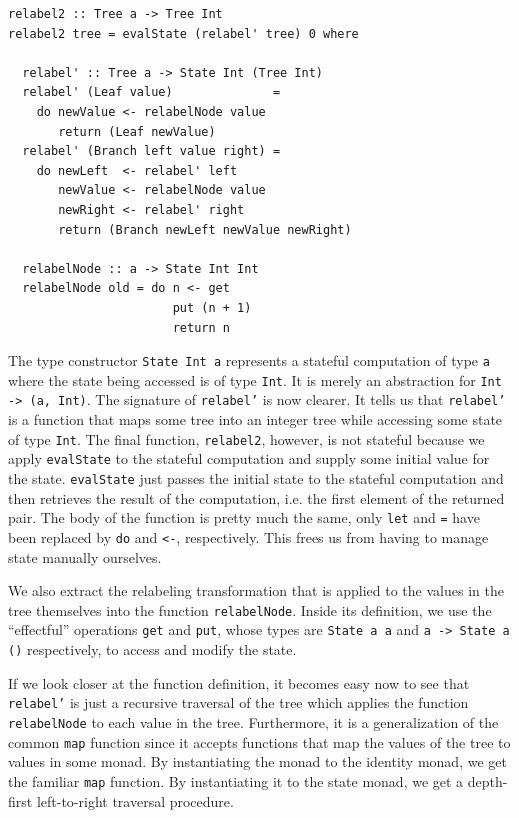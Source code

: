 \documentclass{article}
\begin{document}
\begin{lstlisting}
relabel2 :: Tree a -> Tree Int
relabel2 tree = evalState (relabel' tree) 0 where

  relabel' :: Tree a -> State Int (Tree Int)
  relabel' (Leaf value)              =
    do newValue <- relabelNode value
       return (Leaf newValue)
  relabel' (Branch left value right) =
    do newLeft  <- relabel' left
       newValue <- relabelNode value
       newRight <- relabel' right
       return (Branch newLeft newValue newRight)

  relabelNode :: a -> State Int Int
  relabelNode old = do n <- get
                       put (n + 1)
                       return n
\end{lstlisting}

The type constructor \texttt{State Int a} represents a stateful computation of
type \texttt{a} where the state being accessed is of type \texttt{Int}. It is
merely an abstraction for \texttt{Int -> (a, Int)}. The signature of
\texttt{relabel'} is now clearer. It tells us that \texttt{relabel'} is a
function that maps some tree into an integer tree while accessing some state
of type \texttt{Int}. The final function, \texttt{relabel2}, however, is not
stateful because we apply \texttt{evalState} to the stateful computation and
supply some initial value for the state. \texttt{evalState} just passes the
initial state to the stateful computation and then retrieves the result of the
computation, i.e. the first element of the returned pair. The body of the
function is pretty much the same, only \texttt{let} and \texttt{=} have been
replaced by \texttt{do} and \texttt{<-}, respectively. This frees us from
having to manage state manually ourselves.

We also extract the relabeling transformation that is applied to the values in
the tree themselves into the function \texttt{relabelNode}. Inside its
definition, we use the ``effectful'' operations \texttt{get} and \texttt{put},
whose types are \texttt{State a a} and \texttt{a -> State a ()} respectively,
to access and modify the state.

If we look closer at the function definition, it becomes easy now to see that
\texttt{relabel'} is just a recursive traversal of the tree which applies the
function \texttt{relabelNode} to each value in the tree. Furthermore, it is a
generalization of the common \texttt{map} function since it accepts functions
that map the values of the tree to values in some monad. By instantiating the
monad to the identity monad, we get the familiar \texttt{map} function. By
instantiating it to the state monad, we get a depth-first left-to-right
traversal procedure.
\end{document}
